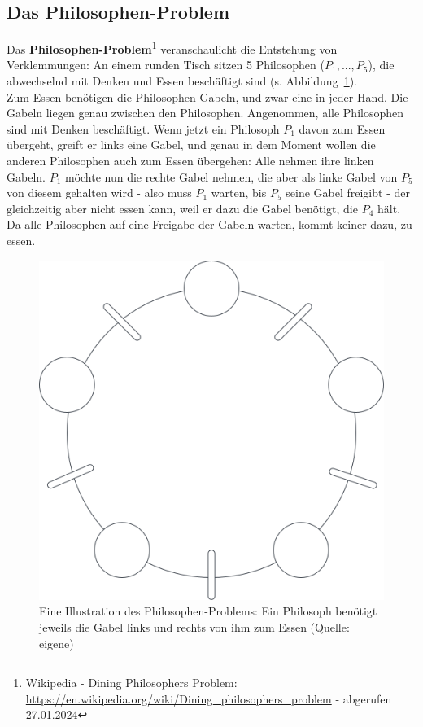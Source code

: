 \subsection{Das Philosophen-Problem}
 Das \textbf{Philosophen-Problem}\footnote{
Wikipedia - Dining Philosophers Problem: \url{https://en.wikipedia.org/wiki/Dining_philosophers_problem} - abgerufen 27.01.2024
}
veranschaulicht die Entstehung von Verklemmungen: An einem runden Tisch sitzen 5 Philosophen ($P_1,...,P_5$), die abwechselnd mit Denken und Essen beschäftigt sind (s. Abbildung~\ref{fig:philosopher}).\\
\noindent
 Zum Essen benötigen die Philosophen Gabeln, und zwar eine in jeder Hand.
 Die Gabeln liegen genau zwischen den Philosophen.
 Angenommen, alle Philosophen sind mit Denken beschäftigt.
 Wenn jetzt ein Philosoph $P_1$ davon zum Essen übergeht, greift er links eine Gabel, und genau in dem Moment wollen die anderen Philosophen auch zum Essen übergehen: Alle nehmen ihre linken Gabeln.
$P_1$ möchte nun die rechte Gabel nehmen, die aber als linke Gabel von $P_5$ von diesem gehalten wird - also muss $P_1$ warten, bis $P_5$ seine Gabel freigibt - der gleichzeitig aber nicht essen kann, weil er dazu die Gabel benötigt, die $P_4$ hält.
Da alle Philosophen auf eine Freigabe der Gabeln warten, kommt keiner dazu, zu essen.

\begin{figure}
    \centering
    \includegraphics[scale=0.25]{chapters/fopt2/img/philosopher}
    \caption{ Eine Illustration des Philosophen-Problems: Ein Philosoph benötigt jeweils die Gabel links und rechts von ihm zum Essen (Quelle: eigene)}
    \label{fig:philosopher}
\end{figure}

